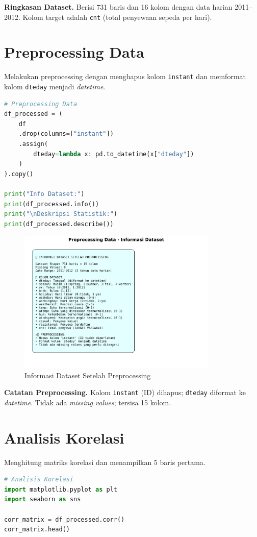 \documentclass[11pt,a4paper]{article}
\begin{document}
\noindent\textbf{Ringkasan Dataset.}
Berisi 731 baris dan 16 kolom dengan data harian 2011--2012. Kolom target adalah \texttt{cnt} (total penyewaan sepeda per hari).

\section{Preprocessing Data}
Melakukan preprocessing dengan menghapus kolom \texttt{instant} dan memformat kolom \texttt{dteday} menjadi \textit{datetime}.
\begin{lstlisting}[language=Python]
# Preprocessing Data
df_processed = (
    df
    .drop(columns=["instant"])
    .assign(
        dteday=lambda x: pd.to_datetime(x["dteday"])
    )
).copy()

print("Info Dataset:")
print(df_processed.info())
print("\nDeskripsi Statistik:")
print(df_processed.describe())
\end{lstlisting}

\begin{figure}[h]
    \centering
    \includegraphics[width=0.85\textwidth]{./OUTPUT/step2_preprocessing_info.png}
    \caption{Informasi Dataset Setelah Preprocessing}
    \label{fig:preprocessing_info}
\end{figure}

\noindent\textbf{Catatan Preprocessing.}
Kolom \texttt{instant} (ID) dihapus; \texttt{dteday} diformat ke \textit{datetime}. Tidak ada \textit{missing values}; tersisa 15 kolom.

\section{Analisis Korelasi}
Menghitung matriks korelasi dan menampilkan 5 baris pertama.
\begin{lstlisting}[language=Python]
# Analisis Korelasi
import matplotlib.pyplot as plt
import seaborn as sns

corr_matrix = df_processed.corr()
corr_matrix.head()
\end{lstlisting}
\end{document}
